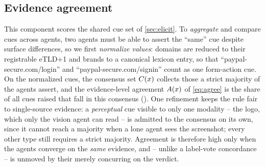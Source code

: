\subsection{Evidence agreement}
\label{sec:agree}
This component scores the shared cue set of \autoref{sec:elicit}. To \emph{aggregate}
and compare cues across agents, two agents must be able to assert the ``same'' cue
despite surface differences, so we first \emph{normalize values}: domains are reduced
to their registrable eTLD+1 and brands to a canonical lexicon entry, so that
``\textsf{paypal-secure.com/login}'' and ``\textsf{paypal-secure.com/signin}'' count as
one form-action cue. On the normalized cues, the consensus set $C(x)$ collects
those a strict majority of the agents assert, and the evidence-level agreement
$A(x)$ of \eqref{eq:agree} is the share of all cues raised that fall in this
consensus (). One refinement keeps the rule fair to single-source evidence: a
\emph{perceptual} cue visible to only one modality -- the logo, which only the
vision agent can read -- is admitted to the consensus on its own, since it cannot reach a
majority when a lone agent sees the screenshot; every other type still requires a strict
majority. Agreement is therefore high only when the agents converge on the
\emph{same} evidence, and -- unlike a label-vote concordance -- is unmoved by their
merely concurring on the verdict.

